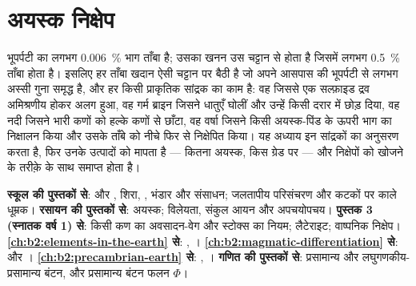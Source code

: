 \chapter{अयस्क निक्षेप}\label{ch:b2:ore-deposits}

भूपर्पटी का लगभग \qty{0.006}{\percent} भाग ताँबा है; उसका खनन उस चट्टान से होता है जिसमें लगभग
\qty{0.5}{\percent} ताँबा होता है। इसलिए हर ताँबा खदान ऐसी चट्टान पर बैठी है जो अपने आसपास की भूपर्पटी से
लगभग अस्सी गुना समृद्ध है, और हर  किसी प्राकृतिक सांद्रक का काम है: वह  जिससे एक
सल्फ़ाइड द्रव अमिश्रणीय होकर अलग हुआ, वह गर्म ब्राइन जिसने धातुएँ घोलीं और उन्हें किसी दरार में छोड़ दिया,
वह नदी जिसने भारी कणों को हल्के कणों से छाँटा, वह वर्षा जिसने किसी अयस्क-पिंड के ऊपरी भाग का निक्षालन किया
और उसके ताँबे को नीचे फिर से निक्षेपित किया। यह अध्याय इन सांद्रकों का अनुसरण करता है, फिर उनके उत्पादों को
मापता है --- कितना अयस्क, किस ग्रेड पर --- और निक्षेपों को खोजने के तरीक़े के साथ समाप्त होता है।

\begin{recall}
\textbf{स्कूल की पुस्तकों से}:  और , शिरा, , भंडार और
संसाधन; जलतापीय परिसंचरण और कटकों पर काले धूम्रक। \textbf{रसायन की पुस्तकों से}: अयस्क;
विलेयता, संकुल आयन और अपचयोपचय। \textbf{पुस्तक 3 (स्नातक वर्ष 1) से}: किसी कण का
अवसादन-वेग और स्टोक्स का नियम; लैटेराइट; वाष्पनिक निक्षेप। \textbf{\cref{ch:b2:elements-in-the-earth}
से}: , । \textbf{\cref{ch:b2:magmatic-differentiation}
से}:  और । \textbf{\cref{ch:b2:precambrian-earth} से}: ,
। \textbf{गणित की पुस्तकों से}: प्रसामान्य और लघुगणकीय-प्रसामान्य बंटन,
और प्रसामान्य
बंटन फलन $\Phi$।
\end{recall}

